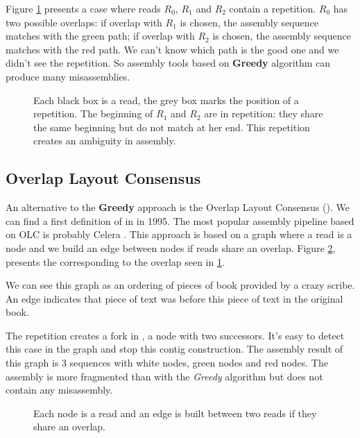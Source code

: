 \documentclass[main]{subfiles}
\begin{document}
Figure \ref{intro:fig:greedy:repetition} presents a case where reads $R_0$, $R_1$ and $R_2$ contain a repetition. $R_0$ has two possible overlaps: if overlap with $R_1$ is chosen, the assembly sequence matches with the green path; if overlap with $R_2$ is chosen, the assembly sequence matches with the red path. We can't know which path is the good one and we didn't see the repetition. So assembly tools based on \textbf{Greedy} algorithm can produce many misassemblies. 

\begin{figure}[ht]
    \centering 
    
    \caption{Each black box is a read, the grey box marks the position of a repetition. The beginning of $R_1$ and $R_2$ are in repetition: they share the same beginning but do not match at her end. This repetition creates an ambiguity in assembly.}
    \label{intro:fig:greedy:repetition}
\end{figure}

\subsection{Overlap Layout Consensus} \label{intro:subsec:OLC}

An alternative to the \textbf{Greedy} approach is the Overlap Layout Consensus (\OLC). We can find a first definition of \OLC in \cite{OLC_myers} in 1995. The most popular assembly pipeline based on OLC is probably Celera \cite{celera_first, celera_second}. This approach is based on a graph where a read is a node and we build an edge between nodes if reads share an overlap. Figure \ref{intro:fig:olc:graph}, presents the \OLC corresponding to the overlap seen in \ref{intro:fig:greedy:repetition}.

We can see this graph as an ordering of pieces of book provided by a crazy scribe. An edge indicates that piece of text was before this piece of text in the original book.

The repetition creates a fork in \OLC, a node with two successors. It's easy to detect this case in the graph and stop this contig construction. The assembly result of this graph is 3 sequences with white nodes, green nodes and red nodes. The assembly is more fragmented than with the \textit{Greedy} algorithm but does not contain any misassembly.

\begin{figure}[ht]
    \centering 
    
    \caption{Each node is a read and an edge is built between two reads if they share an overlap.}
    \label{intro:fig:olc:graph}
\end{figure}
\end{document}
